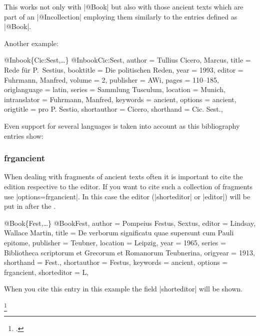 \documentclass[a4paper,
10pt,
greek,
french,
spanish,
italian,
ngerman,
english
]{ltxdoc}
\begin{document}
This works not only with |@Book| but also with those ancient texts which are part of an |@Incollection| employing them similarly to the entries defined as |@Book|.

Another example:
\begin{bibexample}[label=Cic:Sest]{{@}Inbook\{Cic:Sest,…\}}
@Inbook{Cic:Sest,
  author       = {Tullius Cicero, Marcus},
  title        = {Rede für P.\ Sestius},
  booktitle    = {Die politischen Reden},
  year         = {1993},
  editor       = {Fuhrmann, Manfred},
  volume       = {2},
  publisher    = AWi,    %
  pages        = {110--185},
  origlanguage = {latin},
  series       = {Sammlung Tusculum},
  location     = Munich,      %
  intranslator = {Fuhrmann, Manfred},
  keywords     = {ancient},
  options      = {ancient},
  origtitle    = {pro P. Sestio},
  shortauthor  = {Cicero},
  shorthand    = {Cic. Sest.},
}
\end{bibexample}

Even support for several languages is taken into account as this bibliography entries show: 

\subsubsection{frgancient}\label{frgancient}
When dealing with fragments of ancient texts often it is important to cite the edition respective to the editor.
If you want to cite such a collection of fragments use |options={frgancient}|.
In this case the editor (|shorteditor| or |editor|) will be put in after the . 

\begin{bibexample}[label=Fest]{{@}Book\{Fest,…\}}
@Book{Fest,
  author      = {Pompeius Festus, {\relax Sex}tus},
  editor      = {Lindsay, Wallace Martin},
  title       = {De verborum significatu quae supersunt cum Pauli epitome},
  publisher   = {Teubner},
  location    = Leipzig,     %
  year        = {1965},
  series      = {Bibliotheca scriptorum et Grecorum et Romanorum Teubnerina},
  origyear    = {1913},
  shorthand   = {Fest.},
  shortauthor = {Festus},
  keywords    = {ancient},
  options     = {frgancient},
  shorteditor = {L},
}
\end{bibexample}

When you cite this entry in this example the field  |shorteditor| will be shown.
\begin{example}
\footnote{\cite[3]{Fest}.}
\end{example}
\end{document}
